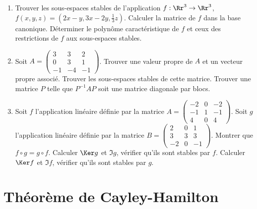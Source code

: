 \documentclass[12pt, class=report,crop=false]{standalone}
\begin{document}
 
\begin{miniexercices}
\sauteligne
\begin{enumerate}

  \item Trouver les sous-espaces stables de l'application $f : \Rr^3 \to \Rr^3$,
  $f(x,y,z) = (2x-y,3x-2y,\frac13z)$. Calculer la matrice de $f$ dans la base canonique. 
  Déterminer le polynôme caractéristique de $f$ et ceux des restrictions de $f$ aux sous-espaces
  stables.

    
  \item Soit  $A = 
  \left(\begin{smallmatrix}
   3 & 3 & 2 \\
0 & 3 & 1 \\
-1 & -4 & -1
  \end{smallmatrix}\right)$.
  Trouver une valeur propre de $A$ et un vecteur propre associé.   
  Trouver les sous-espaces stables de cette matrice. Trouver une matrice $P$ telle que
  $P^{-1}AP$ soit une matrice diagonale par blocs.
  
  \item Soit $f$ l'application linéaire définie
  par la matrice 
  $A = 
  \left(\begin{smallmatrix}
-2 & 0 & -2 \\
-1 & 1 & -1 \\
4 & 0 & 4
\end{smallmatrix}\right)$.
Soit $g$ l'application linéaire définie
  par la matrice 
  $B = 
  \left(\begin{smallmatrix}
2 & 0 & 1 \\
3 & 3 & 3 \\
-2 & 0 & -1
\end{smallmatrix}\right)$.
  Montrer que $f \circ g = g \circ f$. Calculer $\Ker g$ et $\Im g$, vérifier qu'ils sont stables par $f$. Calculer $\Ker f$ et $\Im f$, vérifier qu'ils sont stables par $g$.
  
\end{enumerate}
\end{miniexercices}



\section{Théorème de Cayley-Hamilton}

\end{document}
